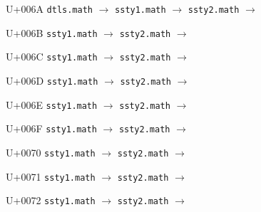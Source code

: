 \documentclass{article}
\begin{document}
\begin{substitutions}
\goodbreak

U+006A  \linebreak
    \texttt{dtls.math} $\to$  \linebreak
    \texttt{ssty1.math} $\to$  \linebreak
    \texttt{ssty2.math} $\to$  

\goodbreak

U+006B  \linebreak
    \texttt{ssty1.math} $\to$  \linebreak
    \texttt{ssty2.math} $\to$  

\goodbreak

U+006C  \linebreak
    \texttt{ssty1.math} $\to$  \linebreak
    \texttt{ssty2.math} $\to$  

\goodbreak

U+006D  \linebreak
    \texttt{ssty1.math} $\to$  \linebreak
    \texttt{ssty2.math} $\to$  

\goodbreak

U+006E  \linebreak
    \texttt{ssty1.math} $\to$  \linebreak
    \texttt{ssty2.math} $\to$  

\goodbreak

U+006F  \linebreak
    \texttt{ssty1.math} $\to$  \linebreak
    \texttt{ssty2.math} $\to$  

\goodbreak

U+0070  \linebreak
    \texttt{ssty1.math} $\to$  \linebreak
    \texttt{ssty2.math} $\to$  

\goodbreak

U+0071  \linebreak
    \texttt{ssty1.math} $\to$  \linebreak
    \texttt{ssty2.math} $\to$  

\goodbreak

U+0072  \linebreak
    \texttt{ssty1.math} $\to$  \linebreak
    \texttt{ssty2.math} $\to$  


\end{substitutions}
\end{document}
